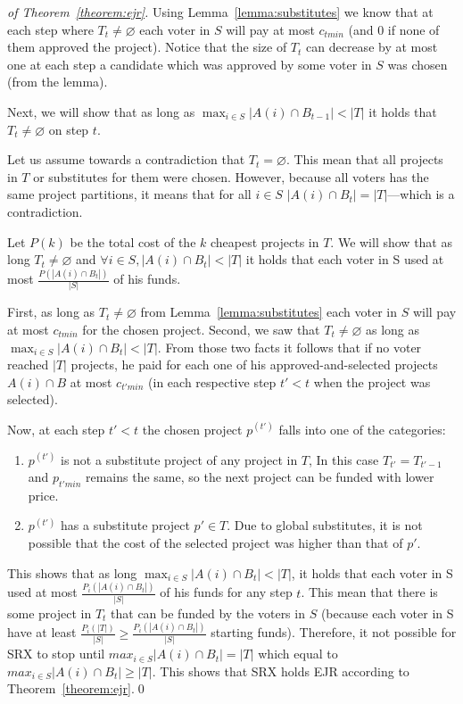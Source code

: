 \documentclass[runningheads]{llncs}
\begin{document}
\begin{proof}[ of Theorem~\ref{theorem:ejr}]
Using Lemma~\ref{lemma:substitutes} we know that at each step where $T_t\neq\varnothing$ each voter in $S$ will pay at most $c_{tmin}$ (and 0 if none of them approved the project). Notice that the size of $T_t$ can decrease by at most one at each step a candidate which was approved by some voter in $S$ was chosen (from the lemma). 

Next, we will show that as long as $\max_{i\in S}|A(i)\cap B_{t-1}|<|T|$ it holds that $T_t\neq\varnothing$ on step $t$. 

Let us assume towards a contradiction that $T_t=\varnothing$. This mean that all projects in $T$ or substitutes for them were chosen. However, because all voters has the same project partitions, it means that for all $i\in S$ $|A(i)\cap B_t|=|T|$---which is a contradiction.

Let  $P(k)$ be the total cost of the $k$ cheapest projects in $T$. We will show that as long $T_t\neq\varnothing$ and $\forall i\in S, |A(i)\cap B_t|<|T|$ it holds that each voter in S used at most $\frac{P(|A(i)\cap B_t|)}{|S|}$ of his funds.

First, as long as $T_t\neq\varnothing$ from  Lemma~\ref{lemma:substitutes} each voter in $S$ will pay at most $c_{tmin}$ for the chosen project. Second, we saw that $T_t\neq\varnothing$ as long as $\max_{i\in S}|A(i)\cap B_t|<|T|$. From those two facts it follows that if no voter reached $|T|$ projects, he paid for each one of his approved-and-selected projects $A(i)\cap B$ at most $c_{t'min}$ (in each respective step $t'<t$ when the project was selected).

Now, at each step $t'<t$ the chosen project $p^{(t')}$ falls into one of the categories:
 
\begin{enumerate}
    \item $p^{(t')}$ is not a substitute project of any project in $T$, In this case $T_{t'}=T_{t'-1}$ and $p_{t'min}$ remains the same, so the next project can be funded with lower price.
    
    \item $p^{(t')}$ has a substitute  project $p'\in T$. Due to  global substitutes, it is not possible that the cost of the selected project was higher than that of $p'$.
\end{enumerate}

This shows that as long $\max_{i\in S}|A(i)\cap B_t|<|T|$, it holds that each voter in S used at most $\frac{P_i(|A(i)\cap B_t|)}{|S|}$ of his funds for any step $t$.  This mean that there is some project in $T_t$ that can be funded by the voters in $S$ (because each voter in S have at least $\frac{P_i(|T|)}{|S|} \geq \frac{P_i(|A(i)\cap B_t|)}{|S|}$ starting funds). Therefore, it not possible for SRX to stop until $max_{i\in S}|A(i)\cap B_t|=|T|$ which equal to $max_{i\in S}|A(i)\cap B_t|\geq|T|$. This shows that SRX holds EJR according to Theorem~\ref{theorem:ejr}.\qed
\end{proof}
\end{document}
